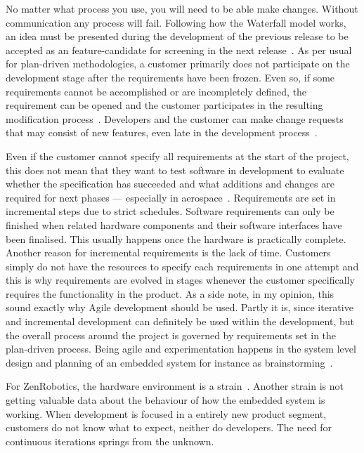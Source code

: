 \documentclass[english]{tktltiki2}
\begin{document}
No matter what process you use, you will need to be able make changes. Without communication any process will fail. Following how the Waterfall model works, an idea must be presented during the development of the previous release to be accepted as an feature-candidate for screening in the next release~\cite{Koi15}. As per usual for plan-driven methodologies, a customer primarily does not participate on the development stage after the requirements have been frozen. Even so, if some requirements cannot be accomplished or are incompletely defined, the requirement can be opened and the customer participates in the resulting modification process~\cite{Hol15b, Koi15}. Developers and the customer can make change requests that may consist of new features, even late in the development process~\cite{Hol15b, Koi15}.

Even if the customer cannot specify all requirements at the start of the project, this does not mean that they want to test software in development to evaluate whether the specification has succeeded and what additions and changes are required for next phases — especially in aerospace~\cite{Hol15b}. Requirements are set in incremental steps due to strict schedules. Software requirements can only be finished when related hardware components and their software interfaces have been finalised. This usually happens once the hardware is practically complete. Another reason for incremental requirements is the lack of time. Customers simply do not have the resources to specify each requirements in one attempt and this is why requirements are evolved in stages whenever the customer specifically requires the functionality in the product. As a side note, in my opinion, this sound exactly why Agile development should be used. Partly it is, since iterative and incremental development can definitely be used within the development, but the overall process around the project is governed by requirements set in the plan-driven process. Being agile and experimentation happens in the system level design and planning of an embedded system for instance as brainstorming~\cite{Hol15b}.

For ZenRobotics, the hardware environment is a strain~\cite{Hol15a}. Another strain is not getting valuable data about the behaviour of how the embedded system is working. When development is focused in a entirely new product segment, customers do not know what to expect, neither do developers. The need for continuous iterations springs from the unknown.
\end{document}

